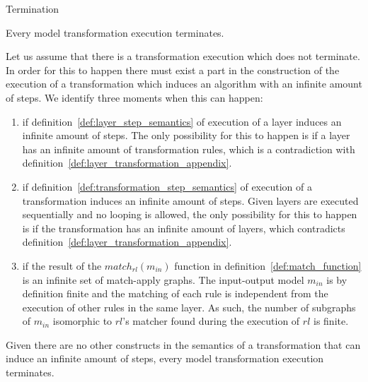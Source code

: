 \begin{proposition}{Termination}

Every model transformation execution terminates.
\end{proposition}
\begin{pf}
Let us assume that there is a transformation execution which does not terminate. In order for this to happen there must exist a part in the construction of the execution of a transformation which induces an algorithm with an infinite amount of steps. We identify three moments when this can happen:
\begin{enumerate}
\item if definition~\ref{def:layer_step_semantics} of execution of a layer induces an infinite amount of steps. The only possibility for this to happen is if a layer has an infinite amount of transformation rules, which is a contradiction with definition~\ref{def:layer_transformation_appendix}.
\item if definition~\ref{def:transformation_step_semantics} of execution of a transformation induces an infinite amount of steps. Given layers are executed sequentially and no looping is allowed, the only possibility for this to happen is if the transformation has an infinite amount of layers, which contradicts definition~\ref{def:layer_transformation_appendix}.
\item if the result of the $match_{rl}(m_{in})$ function in definition~\ref{def:match_function} is an infinite set of match-apply graphs. The input-output model $m_{in}$ is by definition finite and the matching of each rule is independent from the execution of other rules in the same layer. As such, the number of subgraphs of $m_{in}$ isomorphic to $rl$'s matcher found during the execution of $rl$ is finite.
\end{enumerate}
Given there are no other constructs in the semantics of a transformation that can induce an infinite amount of steps, every model transformation execution terminates.
\end{pf}

\clearpage
